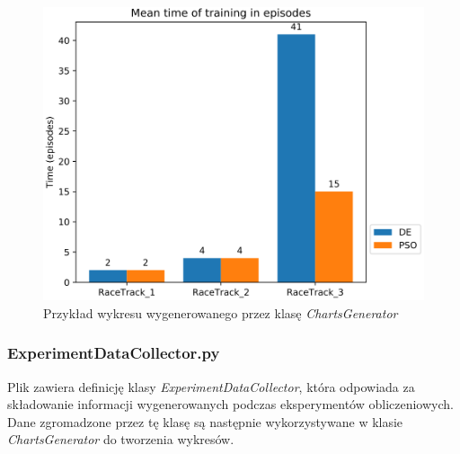 \vspace{0.5cm}
\begin{figure}[H]
\centering
\includegraphics[width=13cm]{resources/figures/train_time_episodes.png}
\caption{Przykład wykresu wygenerowanego przez klasę \textit{ChartsGenerator}}
\label{GeneratedChartExample}
\end{figure}

\subsubsection{ExperimentDataCollector.py}
Plik zawiera definicję klasy \textit{ExperimentDataCollector}, która odpowiada za składowanie informacji wygenerowanych podczas eksperymentów obliczeniowych. Dane zgromadzone przez tę klasę są następnie wykorzystywane w klasie \textit{ChartsGenerator} do tworzenia wykresów.